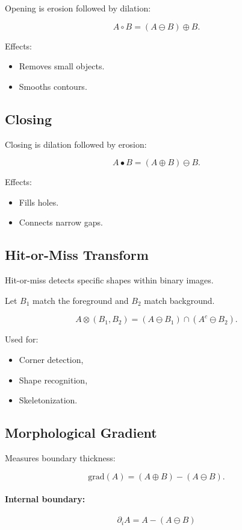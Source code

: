 \documentclass{AnantDocumentation}
\begin{document}
Opening is erosion followed by dilation:

\[
A \circ B = (A \ominus B) \oplus B.
\]

Effects:
\begin{itemize}
\item Removes small objects.
\item Smooths contours.
\end{itemize}

\subsection{Closing}

Closing is dilation followed by erosion:

\[
A \bullet B = (A \oplus B) \ominus B.
\]

Effects:
\begin{itemize}
\item Fills holes.
\item Connects narrow gaps.
\end{itemize}

\subsection{Hit-or-Miss Transform}

Hit-or-miss detects specific shapes within binary images.

Let $B_1$ match the foreground and $B_2$ match background.

\[
A \otimes (B_1, B_2) = (A \ominus B_1) \cap (A^c \ominus B_2).
\]

Used for:
\begin{itemize}
\item Corner detection,
\item Shape recognition,
\item Skeletonization.
\end{itemize}

\subsection{Morphological Gradient}

Measures boundary thickness:

\[
\text{grad}(A) = (A \oplus B) - (A \ominus B).
\]

\paragraph{Internal boundary:}
\[
\partial_i A = A - (A \ominus B)
\]
\end{document}
